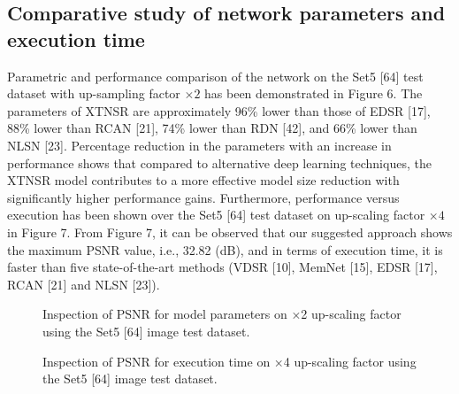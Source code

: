 \documentclass[twocolumn]{svjour3}          %
\begin{document}
\subsection{Comparative study of network parameters and execution time}

Parametric and performance comparison of the network on the Set5 [64] test dataset with up-sampling factor $\times 2$  has been demonstrated in Figure 6. The parameters of XTNSR are approximately 96\% lower than those of EDSR [17], 88\% lower than RCAN [21], 74\% lower than RDN [42], and 66\% lower than NLSN [23]. Percentage reduction in the parameters with an increase in performance shows that compared to alternative deep learning techniques, the XTNSR model contributes to a more effective model size reduction with significantly higher performance gains.
Furthermore, performance versus execution has been shown over the Set5 [64] test dataset on up-scaling factor $\times 4$  in Figure 7. From Figure 7, it can be observed that our suggested approach shows the maximum PSNR value, i.e., 32.82 (dB), and in terms of execution time, it is faster than five state-of-the-art methods (VDSR [10], MemNet [15], EDSR [17], RCAN [21] and NLSN [23]).

\begin{figure}
  \centering
   \caption {Inspection of PSNR for model parameters on ×2 up-scaling factor using the Set5 [64] image test dataset.}
    \label{fig:6}
\end{figure}

\begin{figure}
  \centering
   \caption {Inspection of PSNR for execution time on ×4 up-scaling factor using the Set5 [64] image test dataset.}
    \label{fig:7}
\end{figure}
\end{document}

